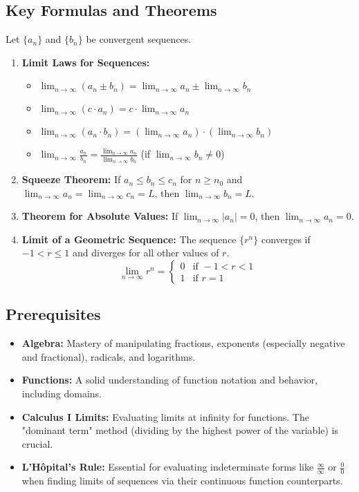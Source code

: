 \documentclass{article}
\begin{document}
\subsection{Key Formulas and Theorems}
Let $\{a_n\}$ and $\{b_n\}$ be convergent sequences.
\begin{enumerate}
    \item \textbf{Limit Laws for Sequences:}
    \begin{itemize}
        \item $\lim_{n \to \infty} (a_n \pm b_n) = \lim_{n \to \infty} a_n \pm \lim_{n \to \infty} b_n$
        \item $\lim_{n \to \infty} (c \cdot a_n) = c \cdot \lim_{n \to \infty} a_n$
        \item $\lim_{n \to \infty} (a_n \cdot b_n) = (\lim_{n \to \infty} a_n) \cdot (\lim_{n \to \infty} b_n)$
        \item $\lim_{n \to \infty} \frac{a_n}{b_n} = \frac{\lim_{n \to \infty} a_n}{\lim_{n \to \infty} b_n}$ (if $\lim_{n \to \infty} b_n \neq 0$)
    \end{itemize}
    \item \textbf{Squeeze Theorem:} If $a_n \le b_n \le c_n$ for $n \ge n_0$ and $\lim_{n \to \infty} a_n = \lim_{n \to \infty} c_n = L$, then $\lim_{n \to \infty} b_n = L$.
    \item \textbf{Theorem for Absolute Values:} If $\lim_{n \to \infty} |a_n| = 0$, then $\lim_{n \to \infty} a_n = 0$.
    \item \textbf{Limit of a Geometric Sequence:} The sequence $\{r^n\}$ converges if $-1 < r \le 1$ and diverges for all other values of $r$.
    \[ \lim_{n \to \infty} r^n = \begin{cases} 0 & \text{if } -1 < r < 1 \\ 1 & \text{if } r = 1 \end{cases} \]
\end{enumerate}

\subsection{Prerequisites}
\begin{itemize}
    \item \textbf{Algebra:} Mastery of manipulating fractions, exponents (especially negative and fractional), radicals, and logarithms.
    \item \textbf{Functions:} A solid understanding of function notation and behavior, including domains.
    \item \textbf{Calculus I Limits:} Evaluating limits at infinity for functions. The "dominant term" method (dividing by the highest power of the variable) is crucial.
    \item \textbf{L'Hôpital's Rule:} Essential for evaluating indeterminate forms like $\frac{\infty}{\infty}$ or $\frac{0}{0}$ when finding limits of sequences via their continuous function counterparts.
\end{itemize}
\end{document}
